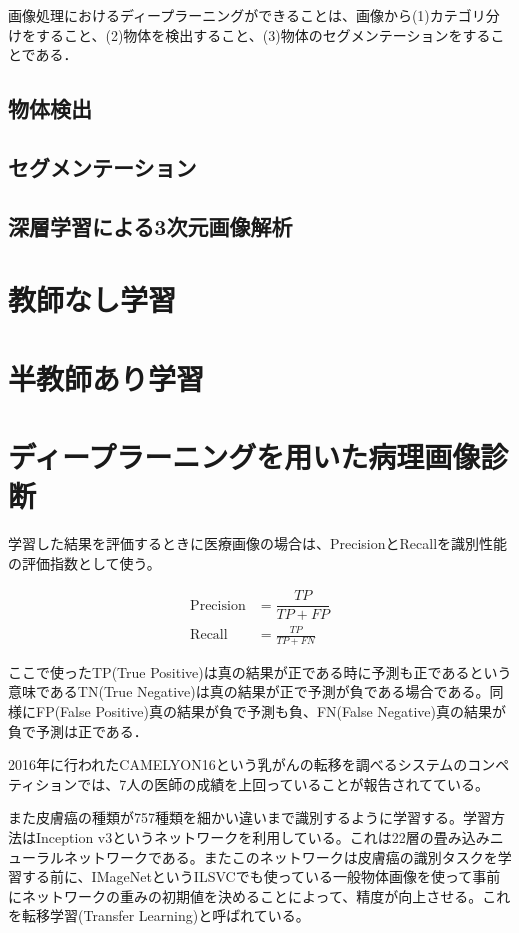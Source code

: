 画像処理におけるディープラーニングができることは、画像から(1)カテゴリ分けをすること、(2)物体を検出すること、(3)物体のセグメンテーションをすることである．

\subsection*{物体検出}

\subsection*{セグメンテーション}

\subsection*{深層学習による3次元画像解析}

\section{教師なし学習}

\section{半教師あり学習}

\section{ディープラーニングを用いた病理画像診断}
学習した結果を評価するときに医療画像の場合は、PrecisionとRecallを識別性能の評価指数として使う。

\begin{align}
  \mathrm{Precision} & = \dfrac{TP}{TP+FP}\\
  \mathrm{Recall} & = \frac{TP}{TP+FN}
\end{align}

ここで使ったTP(True Positive)は真の結果が正である時に予測も正であるという意味であるTN(True Negative)は真の結果が正で予測が負である場合である。同様にFP(False Positive)真の結果が負で予測も負、FN(False Negative)真の結果が負で予測は正である．

2016年に行われたCAMELYON16という乳がんの転移を調べるシステムのコンペティションでは、7人の医師の成績を上回っていることが報告されてている。

また皮膚癌の種類が757種類を細かい違いまで識別するように学習する。学習方法はInception v3というネットワークを利用している。これは22層の畳み込みニューラルネットワークである。またこのネットワークは皮膚癌の識別タスクを学習する前に、IMageNetというILSVCでも使っている一般物体画像を使って事前にネットワークの重みの初期値を決めることによって、精度が向上させる。これを転移学習(Transfer Learning)と呼ばれている。
